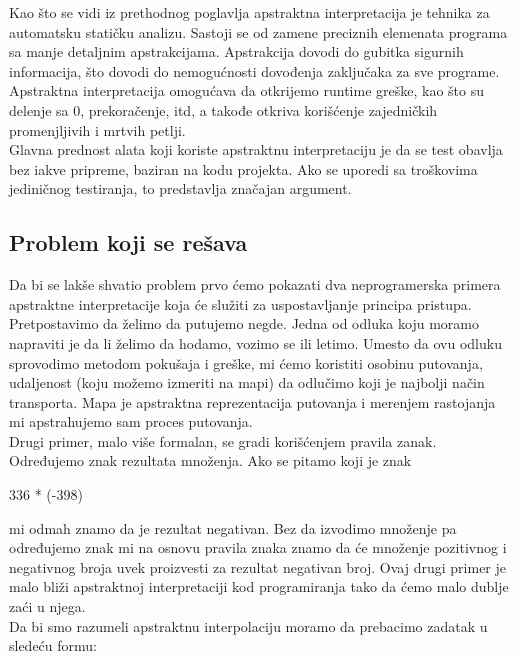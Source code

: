 
Kao što se vidi iz prethodnog poglavlja apstraktna interpretacija je tehnika za automatsku statičku analizu. Sastoji se od zamene preciznih elemenata programa sa manje detaljnim apstrakcijama. Apstrakcija dovodi do gubitka sigurnih informacija, što dovodi do nemogućnosti dovođenja zaključaka za sve programe. Apstraktna interpretacija omogućava da otkrijemo runtime greške, kao što su delenje sa 0, prekoračenje, itd, a takođe otkriva korišćenje zajedničkih promenjljivih i mrtvih petlji. \cite{AbramskyHankin}\\ 
Glavna prednost alata koji koriste apstraktnu interpretaciju je da se test obavlja bez iakve pripreme, baziran na kodu projekta. Ako se uporedi sa troškovima jediničnog testiranja, to predstavlja značajan argument. \cite{AbramskyHankin} \\


\subsection{Problem koji se rešava}
\label{subsec:problem1}
Da bi se lakše shvatio problem prvo ćemo pokazati dva neprogramerska primera apstraktne interpretacije koja će služiti za uspostavljanje principa pristupa. \\

Pretpostavimo da želimo da putujemo negde. Jedna od odluka koju moramo napraviti je da li želimo da hodamo, vozimo se ili letimo. Umesto da ovu odluku sprovodimo metodom pokušaja i greške, mi ćemo koristiti osobinu putovanja, udaljenost (koju možemo izmeriti na mapi) da odlučimo koji je najbolji način transporta. Mapa je apstraktna reprezentacija putovanja i merenjem rastojanja mi apstrahujemo sam proces putovanja. \\

Drugi primer, malo više formalan, se gradi korišćenjem pravila zanak. Određujemo znak rezultata množenja. Ako se pitamo koji je znak

336 * (-398)  

mi odmah znamo da je rezultat negativan. Bez da izvodimo množenje pa određujemo znak mi na osnovu pravila znaka znamo da će množenje pozitivnog i negativnog broja uvek proizvesti za rezultat negativan broj. Ovaj drugi primer je malo bliži apstraktnoj interpretaciji kod programiranja tako da ćemo malo dublje zaći u njega. \\

Da bi smo razumeli apstraktnu interpolaciju moramo da prebacimo zadatak u sledeću formu:

